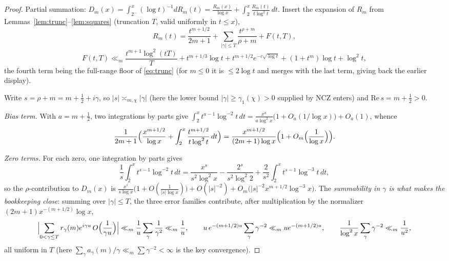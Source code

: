 \documentclass[11pt]{article}
\begin{document}
\begin{proof}
Partial summation: $D_m(x)=\int_{2^-}^x(\log t)^{-1}dR_m(t)
=\frac{R_m(x)}{\log x}+\int_2^x\frac{R_m(t)}{t\log^2t}\,dt$. Insert the expansion of $R_m$ from
Lemmas~\ref{lem:trunc}--\ref{lem:squares}
(truncation $T$, valid uniformly in $t\le x$),
\[
R_m(t)=\frac{t^{m+1/2}}{2m+1}
+\sum_{|\gamma|\le T}\frac{t^{\rho+m}}{\rho+m}+F(t,T),
\]
\[
F(t,T)\ll_m \frac{t^{m+1}\log^2(tT)}{T}+t^{m+1/3}\log t
+t^{m+1/2}e^{-c\sqrt{\log t}}+(1+t^m)\log t+\log^2 t ,
\]
the fourth term being the full-range floor of \eqref{eq:trunc}
(for $m\le0$ it is $\le2\log t$ and merges with the last term, giving
back the earlier display).

Write $s=\rho+m=m+\tfrac12+i\gamma$, so
$|s|\asymp_{m,\chi}|\gamma|$ (here the lower bound
$|\gamma|\ge\gamma_1(\chi)>0$ supplied by NCZ enters) and
$\mathrm{Re}\,s=m+\tfrac12>0$.

\emph{Bias term.} With $a=m+\tfrac12$, two integrations by parts give
$\int_2^x t^{a-1}\log^{-2}t\,dt=\frac{x^a}{a\log^2x}
\bigl(1+O_a(1/\log x)\bigr)+O_a(1)$, whence
\[
\frac{1}{2m+1}\Bigl(\frac{x^{m+1/2}}{\log x}
+\int_2^x\frac{t^{m+1/2}}{t\log^2t}\,dt\Bigr)
=\frac{x^{m+1/2}}{(2m+1)\log x}
\Bigl(1+O_m\Bigl(\frac1{\log x}\Bigr)\Bigr).
\]

\emph{Zero terms.} For each zero, one integration by parts gives
\[
\frac1s\int_2^x t^{s-1}\log^{-2}t\,dt
=\frac{x^{s}}{s^{2}\log^{2}x}
-\frac{2^{s}}{s^{2}\log^{2}2}
+\frac{2}{s^{2}}\int_2^x t^{s-1}\log^{-3}t\,dt ,
\]
so the $\rho$-contribution to $D_m(x)$ is
$\frac{x^{s}}{s\log x}\bigl(1+O(\tfrac1{|s|\log x})\bigr)
+O(|s|^{-2})+O_m\bigl(|s|^{-2}x^{m+1/2}\log^{-3}x\bigr)$. The
\emph{summability in $\gamma$ is what makes the bookkeeping close}:
summing over $|\gamma|\le T$, the three error families contribute,
after multiplication by the normalizer
$(2m+1)x^{-(m+1/2)}\log x$,
\[
\Bigl|\sum_{0<\gamma\le T}r_\gamma(m)e^{i\gamma u}\,
O\Bigl(\frac1{\gamma u}\Bigr)\Bigr|
\ll_m\frac1u\sum_{\gamma}\frac{1}{\gamma^{2}}\ll_m\frac1u,
\qquad
u\,e^{-(m+1/2)u}\sum_\gamma\gamma^{-2}\ll_m ue^{-(m+1/2)u},
\qquad
\frac{1}{\log^{2}x}\sum_\gamma\gamma^{-2}\ll_m\frac1{u^{2}} ,
\]
all uniform in $T$ (here $\sum_\gamma a_\gamma(m)/\gamma
\ll_m\sum\gamma^{-2}<\infty$ is the key convergence).


\end{proof}
\end{document}
